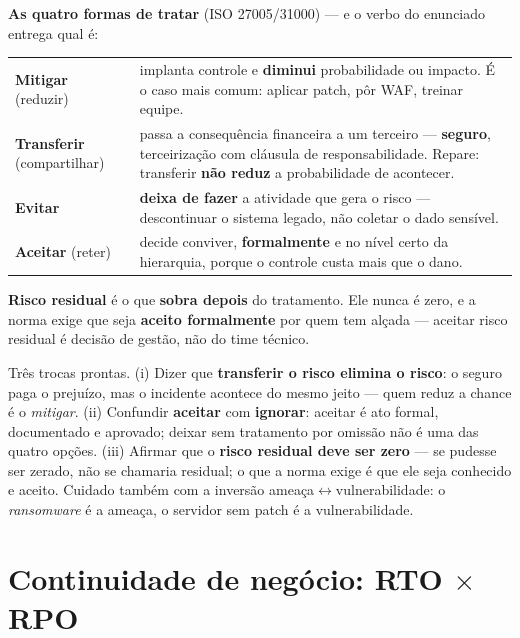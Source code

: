 \textbf{As quatro formas de tratar} (ISO 27005/31000) --- e o verbo do
enunciado entrega qual é:

\begin{center}
\begin{tabular}{@{}p{2.6cm}p{9.4cm}@{}}
\toprule
\textbf{Mitigar} (reduzir) & implanta controle e \textbf{diminui} probabilidade ou impacto. É o caso mais comum: aplicar patch, pôr WAF, treinar equipe. \\
\textbf{Transferir} (compartilhar) & passa a consequência financeira a um terceiro --- \textbf{seguro}, terceirização com cláusula de responsabilidade. Repare: transferir \textbf{não reduz} a probabilidade de acontecer. \\
\textbf{Evitar} & \textbf{deixa de fazer} a atividade que gera o risco --- descontinuar o sistema legado, não coletar o dado sensível. \\
\textbf{Aceitar} (reter) & decide conviver, \textbf{formalmente} e no nível certo da hierarquia, porque o controle custa mais que o dano. \\
\bottomrule
\end{tabular}
\end{center}

\textbf{Risco residual} é o que \textbf{sobra depois} do tratamento. Ele nunca
é zero, e a norma exige que seja \textbf{aceito formalmente} por quem tem
alçada --- aceitar risco residual é decisão de gestão, não do time técnico.

\begin{pegadinha}
Três trocas prontas. (i) Dizer que \textbf{transferir o risco elimina o
risco}: o seguro paga o prejuízo, mas o incidente acontece do mesmo jeito ---
quem reduz a chance é o \emph{mitigar}. (ii) Confundir \textbf{aceitar} com
\textbf{ignorar}: aceitar é ato formal, documentado e aprovado; deixar sem
tratamento por omissão não é uma das quatro opções. (iii) Afirmar que o
\textbf{risco residual deve ser zero} --- se pudesse ser zerado, não se
chamaria residual; o que a norma exige é que ele seja conhecido e aceito.
Cuidado também com a inversão ameaça$\leftrightarrow$vulnerabilidade: o
\emph{ransomware} é a ameaça, o servidor sem patch é a vulnerabilidade.
\end{pegadinha}

\section{Continuidade de negócio: RTO $\times$ RPO}

